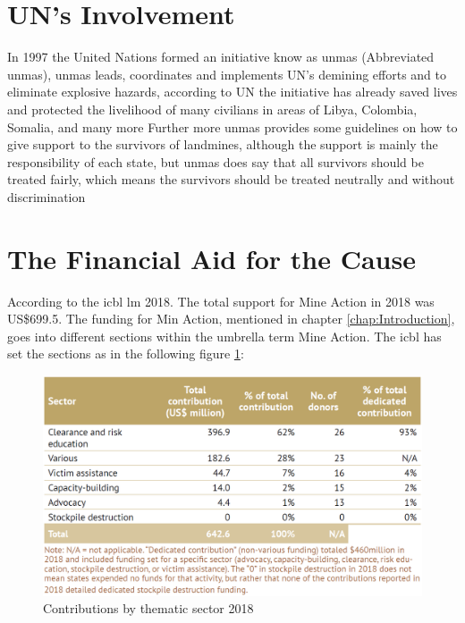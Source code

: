 \section{UN's Involvement}

In 1997 the United Nations formed an initiative know as \gls{unmas} (Abbreviated \gls{unmas}), \gls{unmas} leads, coordinates and implements UN's demining efforts and to eliminate explosive hazards, according to UN the initiative has already saved lives and protected the livelihood of many civilians in areas of Libya, Colombia, Somalia, and many more
Further more \gls{unmas} provides some guidelines on how to give support to the survivors of landmines, although the support is mainly the responsibility of each state, but \gls{unmas} does say that all survivors should be treated fairly, which means the survivors should be treated neutrally and without discrimination

\newpage

\section{The Financial Aid for the Cause}

According to the \gls{icbl} \gls{lm} 2018. The total support for Mine Action in 2018 was US\$699.5. The funding for Min Action, mentioned in chapter \ref{chap:Introduction}, goes into different sections within the umbrella term Mine Action. The \gls{icbl} has set the sections as in the following figure \ref{fig:contributions_by_thematic_sector_2018}:

\begin{figure}[H]
  \centering
  \includegraphics[width=0.6\linewidth]{00 - Images/contributions_by_thematic_sector_2018.png}
  \caption{Contributions by thematic sector 2018 \cite{LandmineMonitor2019}}
  \label{fig:contributions_by_thematic_sector_2018}
\end{figure}

